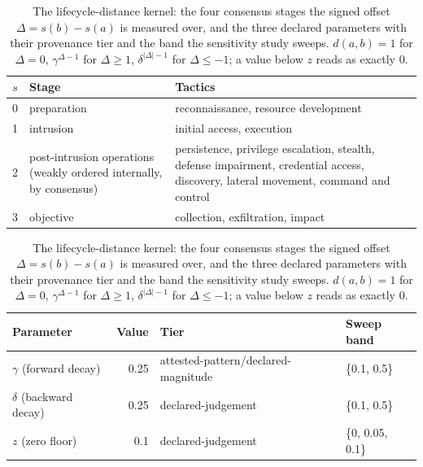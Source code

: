 
\begin{table}[htbp]
\centering\scriptsize
\caption{The lifecycle-distance kernel: the four consensus stages the signed offset $\Delta = s(b) - s(a)$ is measured over, and the three declared parameters with their provenance tier and the band the sensitivity study sweeps. $d(a,b) = 1$ for $\Delta = 0$, $\gamma^{\Delta-1}$ for $\Delta \geq 1$, $\delta^{|\Delta|-1}$ for $\Delta \leq -1$; a value below $z$ reads as exactly $0$.}
\label{tab:overlay-distance-kernel}
\begin{tabular}{@{}c p{} p{}@{}}
\toprule
$s$ & Stage & Tactics \\
\midrule
0 & preparation & reconnaissance, resource development \\
1 & intrusion & initial access, execution \\
2 & post-intrusion operations (weakly ordered internally, by consensus) & persistence, privilege escalation, stealth, defense impairment, credential access, discovery, lateral movement, command and control \\
3 & objective & collection, exfiltration, impact \\
\bottomrule
\end{tabular}
\par\vspace{0.6em}
\begin{tabular}{@{}l r p{} l@{}}
\toprule
Parameter & Value & Tier & Sweep band \\
\midrule
$\gamma$ (forward decay) & 0.25 & attested-pattern/\allowbreak declared-magnitude & \{0.1, 0.5\} \\
$\delta$ (backward decay) & 0.25 & declared-judgement & \{0.1, 0.5\} \\
$z$ (zero floor) & 0.1 & declared-judgement & \{0, 0.05, 0.1\} \\
\bottomrule
\end{tabular}
\end{table}

